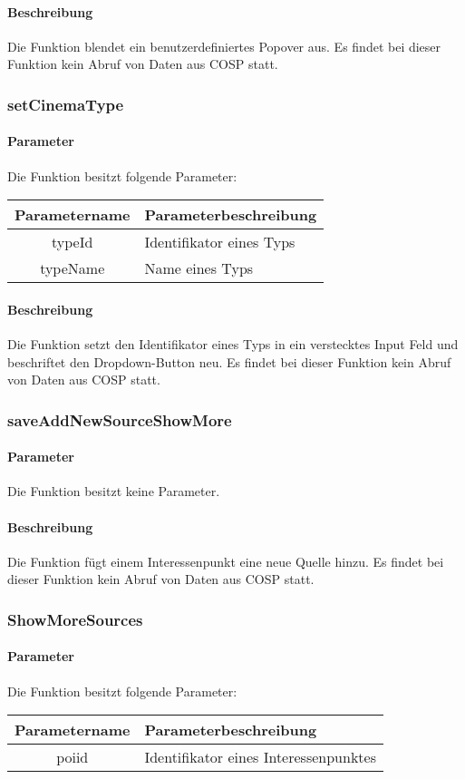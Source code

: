 \paragraph{Beschreibung} Die Funktion blendet ein benutzerdefiniertes Popover aus. Es findet bei dieser Funktion kein Abruf von Daten aus {\glqq COSP\grqq} statt.
\subsubsection{setCinemaType}
\paragraph{Parameter} Die Funktion besitzt folgende Parameter:
\begin{table}[H]
	\begin{tabular}{|c|p{11cm}|}
		\hline
		\textbf{Parametername} & \textbf{Parameterbeschreibung} \\ \hline
		typeId   & Identifikator eines Typs \\ \hline
		typeName & Name eines Typs \\ \hline
	\end{tabular}
\end{table}
\paragraph{Beschreibung} Die Funktion setzt den Identifikator eines Typs in ein verstecktes Input Feld und beschriftet den Dropdown-Button neu. Es findet bei dieser Funktion kein Abruf von Daten aus {\glqq COSP\grqq} statt.
\subsubsection{saveAddNewSourceShowMore}
\paragraph{Parameter} Die Funktion besitzt keine Parameter.
\paragraph{Beschreibung} Die Funktion fügt einem Interessenpunkt eine neue Quelle hinzu. Es findet bei dieser Funktion kein Abruf von Daten aus {\glqq COSP\grqq} statt.
\subsubsection{ShowMoreSources}
\paragraph{Parameter} Die Funktion besitzt folgende Parameter:
\begin{table}[H]
	\begin{tabular}{|c|p{11cm}|}
		\hline
		\textbf{Parametername} & \textbf{Parameterbeschreibung} \\ \hline
		poiid & Identifikator eines Interessenpunktes \\ \hline
	\end{tabular}
\end{table}

